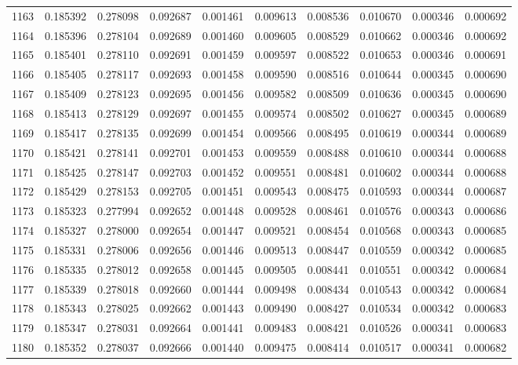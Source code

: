 \begin{tabular}{lrrrrrrrrr}
1163 & 0.185392 & 0.278098 & 0.092687 & 0.001461 & 0.009613 & 0.008536 & 0.010670 & 0.000346 & 0.000692 \\
1164 & 0.185396 & 0.278104 & 0.092689 & 0.001460 & 0.009605 & 0.008529 & 0.010662 & 0.000346 & 0.000692 \\
1165 & 0.185401 & 0.278110 & 0.092691 & 0.001459 & 0.009597 & 0.008522 & 0.010653 & 0.000346 & 0.000691 \\
1166 & 0.185405 & 0.278117 & 0.092693 & 0.001458 & 0.009590 & 0.008516 & 0.010644 & 0.000345 & 0.000690 \\
1167 & 0.185409 & 0.278123 & 0.092695 & 0.001456 & 0.009582 & 0.008509 & 0.010636 & 0.000345 & 0.000690 \\
1168 & 0.185413 & 0.278129 & 0.092697 & 0.001455 & 0.009574 & 0.008502 & 0.010627 & 0.000345 & 0.000689 \\
1169 & 0.185417 & 0.278135 & 0.092699 & 0.001454 & 0.009566 & 0.008495 & 0.010619 & 0.000344 & 0.000689 \\
1170 & 0.185421 & 0.278141 & 0.092701 & 0.001453 & 0.009559 & 0.008488 & 0.010610 & 0.000344 & 0.000688 \\
1171 & 0.185425 & 0.278147 & 0.092703 & 0.001452 & 0.009551 & 0.008481 & 0.010602 & 0.000344 & 0.000688 \\
1172 & 0.185429 & 0.278153 & 0.092705 & 0.001451 & 0.009543 & 0.008475 & 0.010593 & 0.000344 & 0.000687 \\
1173 & 0.185323 & 0.277994 & 0.092652 & 0.001448 & 0.009528 & 0.008461 & 0.010576 & 0.000343 & 0.000686 \\
1174 & 0.185327 & 0.278000 & 0.092654 & 0.001447 & 0.009521 & 0.008454 & 0.010568 & 0.000343 & 0.000685 \\
1175 & 0.185331 & 0.278006 & 0.092656 & 0.001446 & 0.009513 & 0.008447 & 0.010559 & 0.000342 & 0.000685 \\
1176 & 0.185335 & 0.278012 & 0.092658 & 0.001445 & 0.009505 & 0.008441 & 0.010551 & 0.000342 & 0.000684 \\
1177 & 0.185339 & 0.278018 & 0.092660 & 0.001444 & 0.009498 & 0.008434 & 0.010543 & 0.000342 & 0.000684 \\
1178 & 0.185343 & 0.278025 & 0.092662 & 0.001443 & 0.009490 & 0.008427 & 0.010534 & 0.000342 & 0.000683 \\
1179 & 0.185347 & 0.278031 & 0.092664 & 0.001441 & 0.009483 & 0.008421 & 0.010526 & 0.000341 & 0.000683 \\
1180 & 0.185352 & 0.278037 & 0.092666 & 0.001440 & 0.009475 & 0.008414 & 0.010517 & 0.000341 & 0.000682 \\

\end{tabular}
